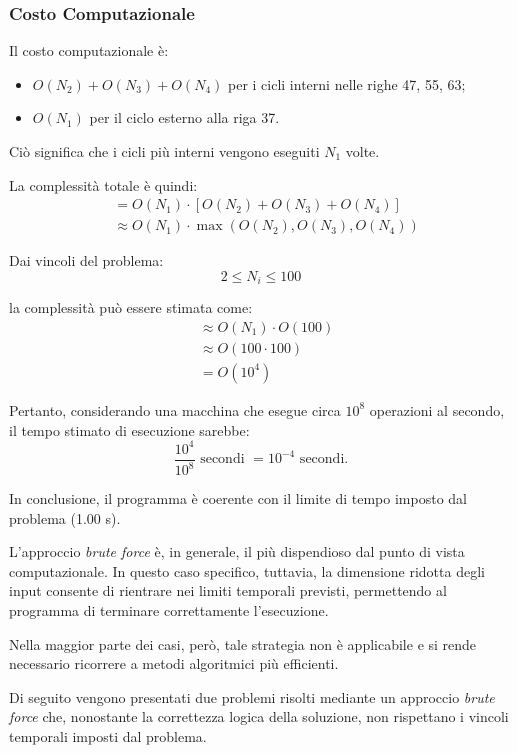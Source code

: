 \subsubsection*{Costo Computazionale}

Il costo computazionale è:
\begin{itemize}
	\item $O(N_2) + O(N_3) + O(N_4)$ per i cicli interni nelle righe 47, 55, 63;
	\item $O(N_1)$ per il ciclo esterno alla riga 37.
\end{itemize}

Ciò significa che i cicli più interni vengono eseguiti $N_1$ volte.

La complessità totale è quindi: 
\begin{align*}
	&= O(N_1) \cdot [O(N_2) + O(N_3) + O(N_4)] \\
	&\approx O(N_1) \cdot \max(O(N_2), O(N_3), O(N_4))
\end{align*}

Dai vincoli del problema:
\[
2 \le N_i \le 100
\]

la complessità può essere stimata come: 
\begin{align*}
	&\approx O(N_1) \cdot O(100) \\
	&\approx O(100 \cdot 100) \\
	&= O(10^4)
\end{align*}

Pertanto, considerando una macchina che esegue circa $10^8$ operazioni al secondo, il tempo stimato di esecuzione sarebbe:
\[
\frac{10^4}{10^8} \text{ secondi } = 10^{-4} \text{ secondi.}
\]

\noindent
In conclusione, il programma è coerente con il limite di tempo imposto dal problema (1.00 s).


L’approccio \emph{brute force} è, in generale, il più dispendioso dal punto di vista computazionale.
In questo caso specifico, tuttavia, la dimensione ridotta degli input consente di rientrare nei limiti temporali previsti, permettendo al programma di terminare correttamente l’esecuzione.

Nella maggior parte dei casi, però, tale strategia non è applicabile e si rende necessario ricorrere a metodi algoritmici più efficienti.

Di seguito vengono presentati due problemi risolti mediante un approccio \emph{brute force} che, nonostante la correttezza logica della soluzione, non rispettano i vincoli temporali imposti dal problema.









